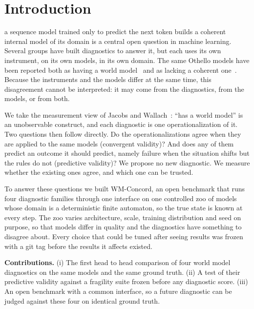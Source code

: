 \documentclass[journal]{IEEEtran}
\begin{document}
\section{Introduction}
 a sequence model trained only to predict the next token builds a coherent internal
model of its domain is a central open question in machine learning. Several groups have built diagnostics to answer
it, but each uses its own instrument, on its own models, in its own domain. The same Othello models have been
reported both as having a world model~\cite{li2023othello, nanda2023emergent, yuan2025revisiting} and as lacking a
coherent one~\cite{vafa2024evaluating, vafa2025inductive}. Because the instruments and the models differ at the
same time, this disagreement cannot be interpreted: it may come from the diagnostics, from the models, or from
both.

We take the measurement view of Jacobs and Wallach~\cite{jacobs2021measurement}: ``has a world model'' is an
unobservable construct, and each diagnostic is one operationalization of it. Two questions then follow directly.
Do the operationalizations agree when they are applied to the same models (convergent validity)? And does any of
them predict an outcome it should predict, namely failure when the situation shifts but the rules do not
(predictive validity)? We propose no new diagnostic. We measure whether the existing ones agree, and which one can
be trusted.

To answer these questions we built WM-Concord, an open benchmark that runs four diagnostic families through one
interface on one controlled zoo of models whose domain is a deterministic finite automaton, so the true state is
known at every step. The zoo varies architecture, scale, training distribution and seed on purpose, so that models
differ in quality and the diagnostics have something to disagree about. Every choice that could be tuned after
seeing results was frozen with a git tag before the results it affects existed.

\textbf{Contributions.} (i) The first head to head comparison of four world model diagnostics on the same models
and the same ground truth. (ii) A test of their predictive validity against a fragility suite frozen before any
diagnostic score. (iii) An open benchmark with a common interface, so a future diagnostic can be judged against
these four on identical ground truth.
\end{document}
